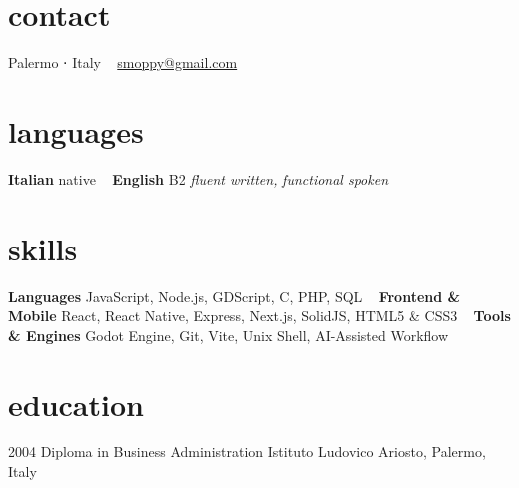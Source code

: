 \documentclass[]{friggeri-cv} %
\begin{document}


\begin{aside} %
\section{contact}
Palermo ⋅ Italy
~
\href{mailto:smoppy@gmail.com}{smoppy@gmail.com}
\section{languages}
\textbf{Italian} native
~
\textbf{English} B2
\emph{fluent written,}
\emph{functional spoken}
\section{skills}
\textbf{Languages}
JavaScript, Node.js,
GDScript, C, PHP, SQL
~
\textbf{Frontend \& Mobile}
React, React Native,
Express, Next.js,
SolidJS, HTML5 \& CSS3
~
\textbf{Tools \& Engines}
Godot Engine, Git,
Vite, Unix Shell,
AI-Assisted Workflow
\end{aside}

\section{education}
\begin{entrylist}
\entry
{2004}
{Diploma {\normalfont in Business Administration}}
{Istituto Ludovico Ariosto, Palermo, Italy}
{}
\end{entrylist}

\end{document}
